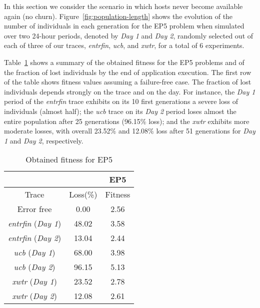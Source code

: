 \documentclass[graybox]{sty/svmult}
\begin{document}
In this section we consider the scenario in which hosts never become
available again (no churn). Figure~\ref{fig:population-length} shows the evolution
of the number of individuals in each generation for the EP5 problem when simulated over two 24-hour periods, denoted by \emph{Day
1} and \emph{Day 2}, randomly selected out of each of three of our traces, \emph{entrfin}, \emph{ucb}, and \emph{xwtr}, for
a total of 6 experiments.

Table~\ref{tab:fitness} shows a summary of the obtained fitness for the EP5 problems and of the fraction of lost individuals
by the end of application execution.  The first row of the table shows
fitness values assuming a failure-free case.  The fraction of lost
individuals depends strongly on the trace and on the day. For instance,
the \emph{Day 1} period of the \emph{entrfin} trace exhibits on its
10 first generations a severe loss of individuals (almost half); the
\emph{ucb} trace on its \emph{Day 2} period loses almost the entire
population after 25 generations (96.15\% loss); and the \emph{xwtr}
exhibits more moderate losses, with overall 23.52\% and 12.08\% loss
after 51 generations for \emph{Day 1} and \emph{Day 2}, respectively.

\begin{table}[h]
    \caption{Obtained fitness for EP5}
\begin{center}
    \begin{tabular}{|c|c|c|}
        \cline{3-3}
        \multicolumn{2}{c|}{} & EP5 \\
        \hline Trace & Loss(\%) & Fitness \\             
        \hline Error free & 0.00 & 2.56  \\            
        \hline \emph{entrfin} (\emph{\emph{Day 1}}) & 48.02 & 3.58 \\
        \hline \emph{entrfin} (\emph{Day 2}) & 13.04 & 2.44 \\
        \hline \emph{ucb} (\emph{\emph{Day 1}}) & 68.00 & 3.98 \\
        \hline \emph{ucb} (\emph{Day 2}) & 96.15 & 5.13 \\
        \hline \emph{xwtr} (\emph{\emph{Day 1}}) & 23.52 & 2.78 \\           
        \hline \emph{xwtr} (\emph{Day 2}) & 12.08 & 2.61 \\           
        \hline     
\end{tabular}     
\end{center}
\label{tab:fitness}
\end{table}
\end{document}
